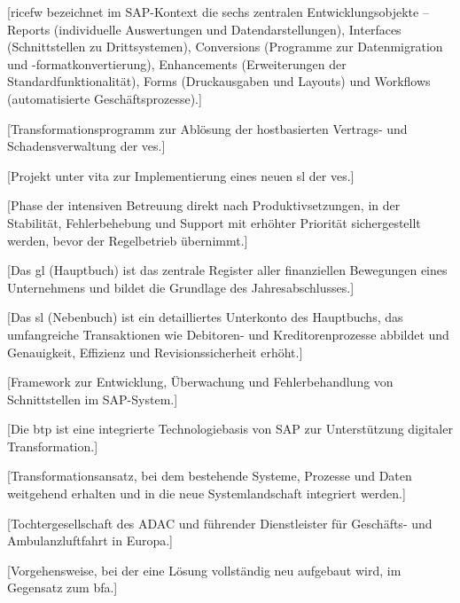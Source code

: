 [\gls{ricefw} bezeichnet im SAP-Kontext die sechs zentralen Entwicklungsobjekte – Reports (individuelle Auswertungen und Datendarstellungen), Interfaces (Schnittstellen zu Drittsystemen), Conversions (Programme zur Datenmigration und -formatkonvertierung), Enhancements (Erweiterungen der Standardfunktionalität), Forms (Druckausgaben und Layouts) und Workflows (automatisierte Geschäftsprozesse).]

[Transformationsprogramm zur Ablösung der hostbasierten Vertrags- und Schadensverwaltung der \gls{ves}.]

[Projekt unter \gls{vita} zur Implementierung eines neuen \gls{sl} der \gls{ves}.]

[Phase der intensiven Betreuung direkt nach Produktivsetzungen, in der Stabilität, Fehlerbehebung und Support mit erhöhter Priorität sichergestellt werden, bevor der Regelbetrieb übernimmt.]

[Das \gls{gl} (Hauptbuch) ist das zentrale Register aller finanziellen Bewegungen eines Unternehmens und bildet die Grundlage des Jahresabschlusses.]

[Das \gls{sl} (Nebenbuch) ist ein detailliertes Unterkonto des Hauptbuchs, das umfangreiche Transaktionen wie Debitoren- und Kreditorenprozesse abbildet und Genauigkeit, Effizienz und Revisionssicherheit erhöht.]

[Framework zur Entwicklung, Überwachung und Fehlerbehandlung von Schnittstellen im SAP-System.]

[Die \gls{btp} ist eine integrierte Technologiebasis von SAP zur Unterstützung digitaler Transformation.]

[Transformationsansatz, bei dem bestehende Systeme, Prozesse und Daten weitgehend erhalten und in die neue Systemlandschaft integriert werden.]

[Tochtergesellschaft des ADAC und führender Dienstleister für Geschäfts- und Ambulanzluftfahrt in Europa.]

[Vorgehensweise, bei der eine Lösung vollständig neu aufgebaut wird, im Gegensatz zum \gls{bfa}.]

